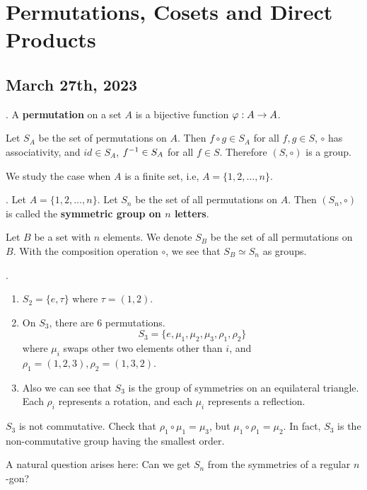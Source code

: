 \chapter{Permutations, Cosets and Direct Products}

\section*{March 27th, 2023}

\setcounter{topic}{7}

.  A \textbf{permutation} on a set \(A\) is a bijective function \(\varphi: A \rightarrow A\).

\rmk Let \(S_A\) be the set of permutations on \(A\). Then \(f \circ g \in S_A\) for all \(f, g \in S\), \(\circ\) has associativity, and \(id \in S_A\), \(f^{-1} \in S_A\) for all \(f \in S\). Therefore \((S, \circ)\) is a group.

We study the case when \(A\) is a finite set, i.e, \(A = \{1, 2, \dots, n\}\).

.  Let \(A = \{1, 2, \dots, n\}\). Let \(S_n\) be the set of all permutations on \(A\). Then \((S_n, \circ)\) is called the \textbf{symmetric group on \(n\) letters}.

Let \(B\) be a set with \(n\) elements. We denote \(S_B\) be the set of all permutations on \(B\). With the composition operation \(\circ\), we see that \(S_B \simeq S_n\) as groups.

\ex.
\begin{enumerate}
    \item \(S_2 = \{e, \tau\}\) where \(\tau = (1, 2)\).
    \item On \(S_3\), there are 6 permutations.
          \[
              S_3 = \{e, \mu_1, \mu_2, \mu_3, \rho_1, \rho_2\}
          \]
          where \(\mu_i\) swaps other two elements other than \(i\), and \(\rho_1 = (1, 2, 3), \rho_2 = (1, 3, 2)\).
    \item Also we can see that \(S_3\) is the group of symmetries on an equilateral triangle. Each \(\rho_i\) represents a rotation, and each \(\mu_i\) represents a reflection.
\end{enumerate}

\rmk \(S_3\) is not commutative. Check that \(\rho_1 \circ \mu_1 = \mu_3\), but \(\mu_1 \circ \rho_1 = \mu_2\). In fact, \(S_3\) is the non-commutative group having the smallest order.

A natural question arises here: Can we get \(S_n\) from the symmetries of a regular \(n\)-gon?

